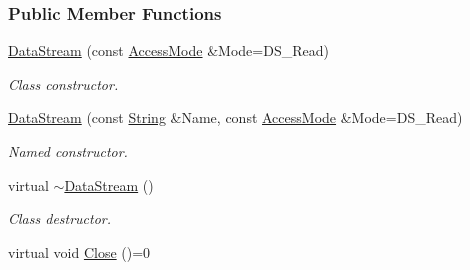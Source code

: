 \subsubsection*{Public Member Functions}
\begin{DoxyCompactItemize}
\item 
\hyperlink{classMezzanine_1_1Resource_1_1DataStream_a5d69345b9e91455ce5bcc3e56e33f0f2}{DataStream} (const \hyperlink{classMezzanine_1_1Resource_1_1DataStream_afe2916e4ed8c06130d032d99c5a532f2}{AccessMode} \&Mode=DS\_\-Read)
\begin{DoxyCompactList}\small\item\em Class constructor. \item\end{DoxyCompactList}\item 
\hyperlink{classMezzanine_1_1Resource_1_1DataStream_a3efd57c5ec4a24ae0f03469c7aae3f40}{DataStream} (const \hyperlink{namespaceMezzanine_acf9fcc130e6ebf08e3d8491aebcf1c86}{String} \&Name, const \hyperlink{classMezzanine_1_1Resource_1_1DataStream_afe2916e4ed8c06130d032d99c5a532f2}{AccessMode} \&Mode=DS\_\-Read)
\begin{DoxyCompactList}\small\item\em Named constructor. \item\end{DoxyCompactList}\item 
\hypertarget{classMezzanine_1_1Resource_1_1DataStream_aafa07b258113f048729ae8e285d9ea8c}{
virtual \hyperlink{classMezzanine_1_1Resource_1_1DataStream_aafa07b258113f048729ae8e285d9ea8c}{$\sim$DataStream} ()}
\label{classMezzanine_1_1Resource_1_1DataStream_aafa07b258113f048729ae8e285d9ea8c}

\begin{DoxyCompactList}\small\item\em Class destructor. \item\end{DoxyCompactList}\item 
\hypertarget{classMezzanine_1_1Resource_1_1DataStream_aff1a3ceed4d6db62361544440c1bac32}{
virtual void \hyperlink{classMezzanine_1_1Resource_1_1DataStream_aff1a3ceed4d6db62361544440c1bac32}{Close} ()=0}
\label{classMezzanine_1_1Resource_1_1DataStream_aff1a3ceed4d6db62361544440c1bac32}


\end{DoxyCompactItemize}
